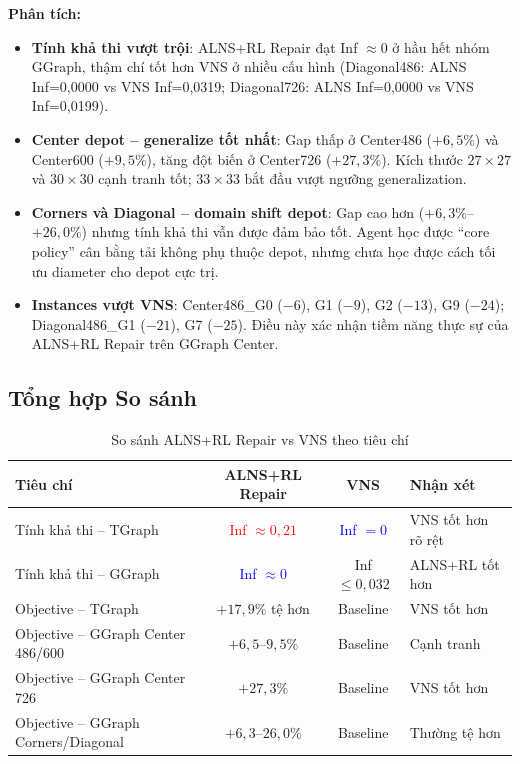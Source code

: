 \documentclass[12pt, a4paper]{article}
\begin{document}
\textbf{Phân tích:}
\begin{itemize}
  \item \textbf{Tính khả thi vượt trội}: ALNS+RL Repair đạt Inf $\approx 0$ ở hầu
        hết nhóm GGraph, thậm chí tốt hơn VNS ở nhiều cấu hình
        (Diagonal486: ALNS Inf=0{,}0000 vs VNS Inf=0{,}0319;
        Diagonal726: ALNS Inf=0{,}0000 vs VNS Inf=0{,}0199).

  \item \textbf{Center depot -- generalize tốt nhất}: Gap thấp ở
        Center486 ($+6{,}5\%$) và Center600 ($+9{,}5\%$), tăng đột biến ở
        Center726 ($+27{,}3\%$). Kích thước $27\!\times\!27$ và $30\!\times\!30$
        cạnh tranh tốt; $33\!\times\!33$ bắt đầu vượt ngưỡng generalization.

  \item \textbf{Corners và Diagonal -- domain shift depot}: Gap cao hơn
        ($+6{,}3\%$--$+26{,}0\%$) nhưng tính khả thi vẫn được đảm bảo tốt.
        Agent học được ``core policy'' cân bằng tải không phụ thuộc depot,
        nhưng chưa học được cách tối ưu diameter cho depot cực trị.

  \item \textbf{Instances vượt VNS}: Center486\_G0 ($-6$), G1 ($-9$), G2 ($-13$),
        G9 ($-24$); Diagonal486\_G1 ($-21$), G7 ($-25$).
        Điều này xác nhận tiềm năng thực sự của ALNS+RL Repair trên GGraph Center.
\end{itemize}

\subsection{Tổng hợp So sánh}

\begin{table}[H]
  \centering
  \caption{So sánh ALNS+RL Repair vs VNS theo tiêu chí}
  \begin{tabular}{lccl}
    \toprule
    Tiêu chí & ALNS+RL Repair & VNS & Nhận xét \\
    \midrule
    Tính khả thi -- TGraph &
    \textcolor{red}{Inf $\approx 0{,}21$} &
    \textcolor{blue}{Inf $= 0$} & VNS tốt hơn rõ rệt \\
    Tính khả thi -- GGraph &
    \textcolor{blue}{Inf $\approx 0$} &
    Inf $\leq 0{,}032$ & ALNS+RL tốt hơn \\
    Objective -- TGraph & $+17{,}9\%$ tệ hơn & Baseline & VNS tốt hơn \\
    Objective -- GGraph Center 486/600 & $+6{,}5$--$9{,}5\%$ & Baseline & Cạnh tranh \\
    Objective -- GGraph Center 726 & $+27{,}3\%$ & Baseline & VNS tốt hơn \\
    Objective -- GGraph Corners/Diagonal & $+6{,}3$--$26{,}0\%$ & Baseline & Thường tệ hơn \\
    \bottomrule
  \end{tabular}
\end{table}
\end{document}
